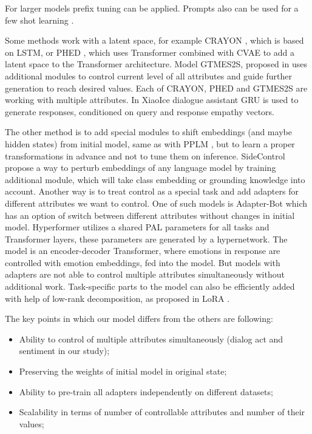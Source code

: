 \documentclass[11pt]{article}
\begin{document}
For larger models prefix tuning \cite{prefix_tuning} can be applied. Prompts also can be used for a few shot learning \cite{prompt_based_few_shot}.

Some methods work with a latent space, for example CRAYON \cite{hu2021controllable}, which is based on LSTM, or PHED \cite{phed}, which uses Transformer combined with CVAE to add a latent space to the Transformer architecture. Model GTMES2S, proposed in \cite{neural_meta_words} uses additional modules to control current level of all attributes and guide further generation to reach desired values. Each of CRAYON, PHED and GTMES2S are working with multiple attributes. In XiaoIce dialogue assistant \cite{zhou2019design} GRU is used to generate responses, conditioned on query and response empathy vectors.

The other method is to add special modules to shift embeddings (and maybe hidden states) from initial model, same as with PPLM \cite{pplm}, but to learn a proper transformations in advance and not to tune them on inference. SideControl \cite{side_control} propose a way to perturb embeddings of any language model by training additional module, which will take class embedding or grounding knowledge into account. Another way is to treat control as a special task and add adapters \cite{houlsby2019parameterefficient} for different attributes we want to control. One of such models is Adapter-Bot \cite{madotto2020adapterbot} which has an option of switch between different attributes without changes in initial model. Hyperformer \cite{mahabadi2021parameter} utilizes a shared PAL parameters for all tasks and Transformer layers, these parameters are generated by a hypernetwork. The model \cite{xie2021empathetic} is an encoder-decoder Transformer, where emotions in response are controlled with emotion embeddings, fed into the model. But models with adapters are not able to control multiple attributes simultaneously without additional work. Task-specific parts to the model can also be efficiently added with help of low-rank decomposition, as proposed in LoRA \cite{lora}.

The key points in which our model differs from the others are following:

\begin{itemize}
    \item Ability to control of multiple attributes simultaneously (dialog act and sentiment in our study);
    \item Preserving the weights of initial model in original state;
    \item Ability to pre-train all adapters independently on different datasets;
    \item Scalability in terms of number of controllable attributes and number of their values;
\end{itemize}
\end{document}
